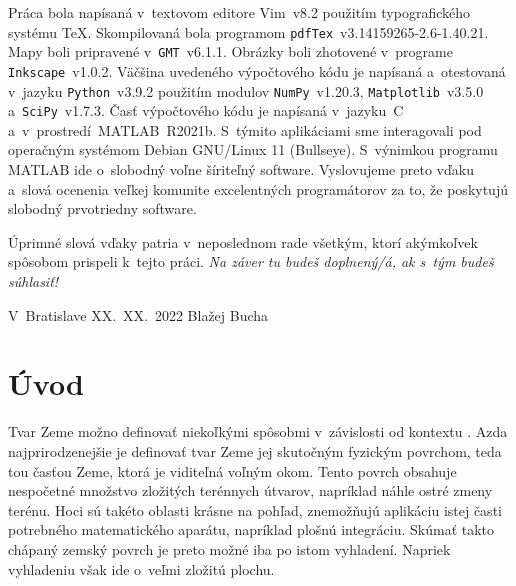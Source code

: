 \documentclass[a4paper, 12pt]{book}
\begin{document}
Práca bola napísaná v~textovom editore Vim~v8.2 použitím typografického systému 
\TeX.  Skompilovaná bola programom \texttt{pdfTex}~v3.14159265-2.6-1.40.21.  
Mapy boli pripravené v~\texttt{GMT}~v6.1.1.  Obrázky boli zhotovené v~programe 
\texttt{Inkscape}~v1.0.2.  Väčšina uvedeného výpočtového kódu je napísaná 
a~otestovaná v~jazyku \texttt{Python}~v3.9.2 použitím modulov 
\texttt{NumPy}~v1.20.3, \texttt{Matplotlib}~v3.5.0 a~\texttt{SciPy}~v1.7.3.  
Časť výpočtového kódu je napísaná v~jazyku~C a~v~prostredí~MATLAB~R2021b.  
S~týmito aplikáciami sme interagovali pod operačným systémom Debian GNU/Linux 
11 (Bullseye).  S~výnimkou programu MATLAB ide o~slobodný voľne šíriteľný 
software.  Vyslovujeme preto vďaku a~slová ocenenia veľkej komunite 
excelentných programátorov za to, že poskytujú slobodný prvotriedny software.

Úprimné slová vďaky patria v~neposlednom rade všetkým, ktorí akýmkoľvek 
spôsobom prispeli k~tejto práci. \emph{Na záver tu budeš doplnený/á, ak s~tým 
budeš súhlasiť!}


\vspace{4ex}

\noindent V~Bratislave XX.~XX.~2022 \hfill Blažej Bucha






\tableofcontents
\newpage







\chapter{Úvod}

Tvar Zeme možno definovať niekoľkými spôsobmi v~závislosti od kontextu 
\citep{MoritzTheFigureOfTheEarth}.  Azda najprirodzenejšie je definovať tvar 
Zeme jej skutočným fyzickým povrchom, teda tou časťou Zeme, ktorá je viditeľná 
voľným okom.  Tento povrch obsahuje nespočetné množstvo zložitých terénnych 
útvarov, napríklad náhle ostré zmeny terénu.  Hoci sú takéto oblasti krásne na 
pohľad, znemožňujú aplikáciu istej časti potrebného matematického aparátu, 
napríklad plošnú integráciu.  Skúmať takto chápaný zemský povrch je preto možné 
iba po istom vyhladení.  Napriek vyhladeniu však ide o~veľmi zložitú plochu.
\end{document}
